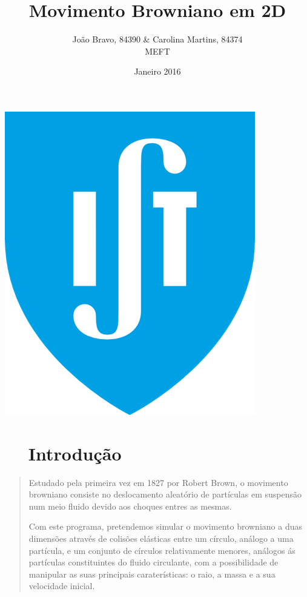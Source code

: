 \documentclass[11pt]{article}
\title{\bf Movimento Browniano em 2D}
\author{Jo\~{a}o Bravo, 84390 \& Carolina Martins, 84374\\MEFT}
\date{Janeiro 2016}
\begin{document}
\maketitle
\begin{center}
\includegraphics[scale=0.08]{IST_Logo}
\end{center}
\noindent\hrulefill

\section*{$\quad$ Introdu\c{c}\~{a}o}
\begin{quote}
 \qquad Estudado pela primeira vez em 1827 por Robert Brown, o movimento browniano consiste no deslocamento aleat\'{o}rio de part\'{i}culas em suspens\~{a}o num meio fluido devido aos choques entres as mesmas.
 \par
 \qquad Com este programa, pretendemos simular o movimento browniano a duas dimens\~{o}es atrav\'{e}s de colis\~{o}es el\'{a}sticas entre um c\'{i}rculo, an\'{a}logo a uma part\'{i}cula, e um conjunto de c\'{i}rculos relativamente menores, an\'{a}logos \'{a}s part\'{i}culas constituintes do fluido circulante, com a possibilidade de manipular as suas principais carater\'{i}sticas: o raio, a massa e a sua velocidade inicial.
\end{quote}
\end{document}
